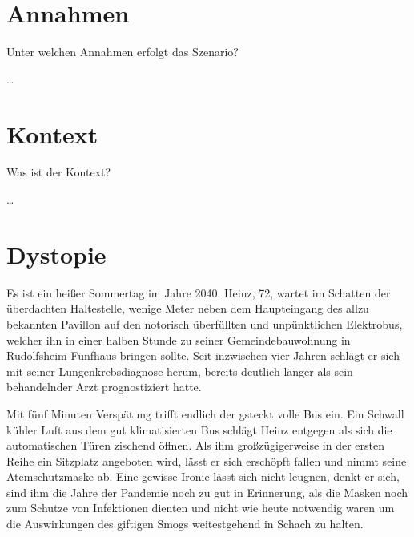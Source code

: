 \documentclass[twoside, a4paper, DIV=11, open=any, bibliography=totoc]{scrbook}
\begin{document}
\section{Annahmen} \label{sec:szenannahmen}

Unter welchen Annahmen erfolgt das Szenario?

\ldots

\section{Kontext} \label{sec:szenkontext}

Was ist der Kontext?

\ldots

\section{Dystopie} \label{sec:szendystopie}

Es ist ein heißer Sommertag im Jahre 2040. Heinz, 72, 
wartet im Schatten der überdachten Haltestelle, wenige Meter neben dem Haupteingang des allzu bekannten Pavillon
auf den notorisch überfüllten und unpünktlichen Elektrobus,
welcher ihn in einer halben Stunde zu seiner Gemeindebauwohnung in Rudolfsheim-Fünfhaus bringen sollte.
Seit inzwischen vier Jahren schlägt er sich mit seiner Lungenkrebsdiagnose herum, bereits deutlich länger
als sein behandelnder Arzt prognostiziert hatte.

Mit fünf Minuten Verspätung trifft endlich der gsteckt volle Bus ein. Ein Schwall kühler Luft aus dem gut klimatisierten Bus schlägt Heinz
entgegen als sich die automatischen Türen zischend öffnen. 
Als ihm großzügigerweise in der ersten Reihe ein Sitzplatz angeboten wird, lässt er sich erschöpft fallen und nimmt seine Atemschutzmaske ab.
Eine gewisse Ironie lässt sich nicht leugnen, denkt er sich, sind ihm die Jahre der Pandemie noch zu gut in Erinnerung,
als die Masken noch zum Schutze von Infektionen dienten und nicht wie heute notwendig waren um 
die Auswirkungen des giftigen Smogs weitestgehend in Schach zu halten.
\end{document}
